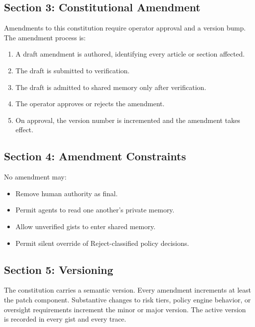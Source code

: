 \documentclass[12pt,letterpaper]{article}
\begin{document}
\subsection{Section 3: Constitutional Amendment}

Amendments to this constitution require operator approval and a version bump. The amendment process is:

\begin{enumerate}
    \item A draft amendment is authored, identifying every article or section affected.
    \item The draft is submitted to verification.
    \item The draft is admitted to shared memory only after verification.
    \item The operator approves or rejects the amendment.
    \item On approval, the version number is incremented and the amendment takes effect.
\end{enumerate}

\subsection{Section 4: Amendment Constraints}

No amendment may:

\begin{itemize}
    \item Remove human authority as final.
    \item Permit agents to read one another's private memory.
    \item Allow unverified gists to enter shared memory.
    \item Permit silent override of Reject-classified policy decisions.
\end{itemize}

\subsection{Section 5: Versioning}

The constitution carries a semantic version. Every amendment increments at least the patch component. Substantive changes to risk tiers, policy engine behavior, or oversight requirements increment the minor or major version. The active version is recorded in every gist and every trace.

\end{document}
